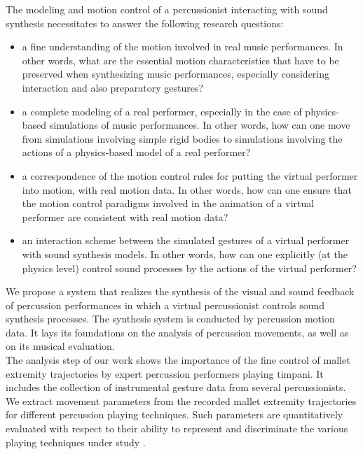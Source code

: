 The modeling and motion control of a percussionist interacting with sound synthesis necessitates to answer the following research questions:

\begin{itemize}
	\item a fine understanding of the motion involved in real music performances. In other words, what are the essential motion characteristics that have to be preserved when synthesizing music performances, especially considering interaction and also preparatory gestures?
	\item a complete modeling of a real performer, especially in the case of physics-based simulations of music performances. In other words, how can one move from simulations involving simple rigid bodies to simulations involving the actions of a physics-based model of a real performer?
	\item a correspondence of the motion control rules for putting the virtual performer into motion, with real motion data. In other words, how can one ensure that the motion control paradigms involved in the animation of a virtual performer are consistent with real motion data?
	\item an interaction scheme between the simulated gestures of a virtual performer with sound synthesis models. In other words, how can one explicitly (at the physics level) control sound processes by the actions of the virtual performer?
\end{itemize}

We propose a system that realizes the synthesis of the visual and sound feedback of percussion performances in which a virtual percussionist controls sound synthesis processes. The synthesis system is conducted by percussion motion data. It lays its foundations on the analysis of percussion movements, as well as on its musical evaluation.\\

The analysis step of our work shows the importance of the fine control of mallet extremity trajectories by expert percussion performers playing timpani. It includes the collection of instrumental gesture data from several percussionists. We extract movement parameters from the recorded mallet extremity trajectories for different percussion playing techniques. Such parameters are quantitatively evaluated with respect to their ability to represent and discriminate the various playing techniques under study .\\

